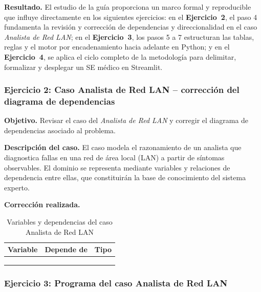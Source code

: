 \textbf{Resultado.} El estudio de la gu\'ia proporciona un marco formal y
reproducible que influye directamente en los siguientes ejercicios: en el
\textbf{Ejercicio~2}, el paso 4 fundamenta la revisi\'on y correcci\'on de
dependencias y direccionalidad en el caso \emph{Analista de Red LAN}; en el
\textbf{Ejercicio~3}, los pasos 5 a 7 estructuran las tablas, reglas y el
motor por encadenamiento hacia adelante en Python; y en el
\textbf{Ejercicio~4}, se aplica el ciclo completo de la metodolog\'ia para
delimitar, formalizar y desplegar un SE m\'edico en Streamlit.

\subsubsection{Ejercicio 2: Caso Analista de Red LAN -- correcci\'on del diagrama de dependencias}

\textbf{Objetivo.} Revisar el caso del \emph{Analista de Red LAN} y
corregir el diagrama de dependencias asociado al problema.

\textbf{Descripci\'on del caso.} El caso modela el razonamiento de un
analista que diagnostica fallas en una red de \'area local (LAN) a
partir de s\'intomas observables. El dominio se representa mediante
variables y relaciones de dependencia entre ellas, que constituir\'an
la base de conocimiento del sistema experto.

\textbf{Correcci\'on realizada.} 

\begin{table}[htbp]
	\caption{Variables y dependencias del caso Analista de Red LAN}
	\label{tab:lan}
	\centering
	\small
	\begin{tabular}{p{2.4cm}p{2.4cm}p{1.7cm}}
		\toprule
		\textbf{Variable} & \textbf{Depende de} & \textbf{Tipo} \\
		\midrule
		\TODO{} & \TODO{} & \TODO{} \\
		\TODO{} & \TODO{} & \TODO{} \\
		\TODO{} & \TODO{} & \TODO{} \\
		\bottomrule
	\end{tabular}
\end{table}

\subsubsection{Ejercicio 3: Programa del caso Analista de Red LAN}


